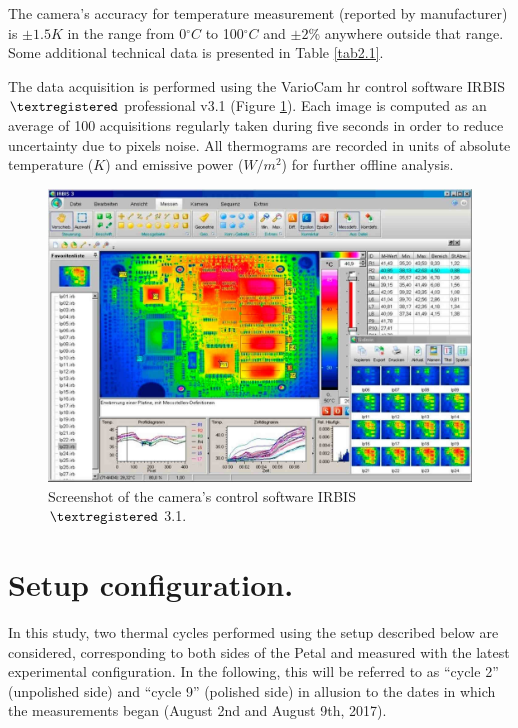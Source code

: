 		The camera’s accuracy for temperature measurement (reported by manufacturer) is $\pm 1.5 K$ in the range from 0\space$^\circ C$ to 100\space$^\circ C$ and $\pm2$\% anywhere outside that range. Some additional technical data is presented in Table \ref{tab2.1}.
		
		The data acquisition is performed using the VarioCam hr control software IRBIS $\textregistered$ professional v3.1 (Figure \ref{fig2.6}). Each image is computed as an average of 100 acquisitions regularly taken during five seconds in order to reduce uncertainty due to pixels noise. All thermograms are recorded in units of absolute temperature ($K$) and emissive power ($W/m^2$) for further offline analysis.
		
		\begin{figure}[ht!]
			\centering
			\captionsetup{justification=centering,margin=2cm}
			\includegraphics[scale=0.25]{Figures/Chapter02/IRBISimage.jpg}
			\caption{Screenshot of the camera’s control software IRBIS $\textregistered$ 3.1.}\label{fig2.6}
		\end{figure}\bigskip
		
	\section{Setup configuration.}\label{section2.4}
	
		In this study, two thermal cycles performed using the setup described below are considered, corresponding to both sides of the Petal and measured with the latest experimental configuration. In the following, this will be referred to as “cycle 2” (unpolished side) and “cycle 9” (polished side) in allusion to the dates in which the measurements began (August 2nd and August 9th, 2017). 
		
